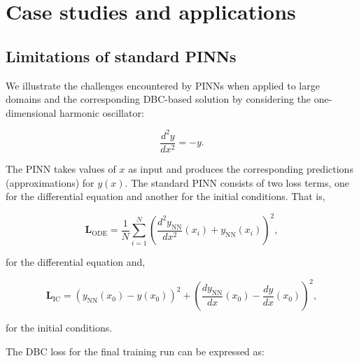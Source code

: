 
\section{Case studies and applications}\label{sec:dbc_cases}




\subsection{Limitations of standard PINNs}\label{sec:dbc_oscillator}

We illustrate the challenges encountered by PINNs when applied to large domains and the corresponding DBC-based solution by considering the one-dimensional harmonic oscillator:

\begin{equation}\label{eq:dbc_7}
\frac{d^2y}{dx^2}=-y.
\end{equation}

The PINN takes values of $x$ as input and produces the corresponding predictions (approximations) for $y(x)$. The standard PINN consists of two loss terms, one for the differential equation and another for the initial conditions. That is,

\begin{equation}\label{eq:dbc_8}
\mathbf{L}_{\mathrm{ODE}}=\frac{1}{N}\sum_{i=1}^N\left(\frac{d^2y_{\mathrm{NN}}}{dx^2}(x_i)+y_{\mathrm{NN}}(x_i)\right)^2,
\end{equation}

for the differential equation and,

\begin{equation}\label{eq:dbc_9}
\mathbf{L}_{\mathrm{IC}}=\left(y_{\mathrm{NN}}(x_0)-y(x_0)\right)^2+\left(\frac{dy_{\mathrm{NN}}}{dx}(x_0)-\frac{dy}{dx}(x_0)\right)^2,
\end{equation}

for the initial conditions.

The DBC loss for the final training run can be expressed as:

